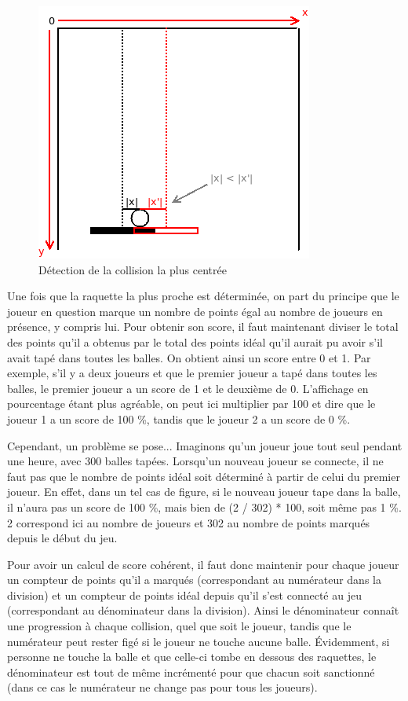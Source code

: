 \documentclass[a4paper,12pt]{article}
\begin{document}
\begin{figure}[h]
 \begin{center}
  \includegraphics[scale=.5]{collision.png}
 \end{center}
 \caption{Détection de la collision la plus centrée}
\end{figure}

Une fois que la raquette la plus proche est déterminée, on part du principe que le joueur en question marque un nombre de points égal au nombre de joueurs en présence, y compris lui. Pour obtenir son score, il faut maintenant diviser le total des points qu'il a obtenus par le total des points idéal qu'il aurait pu avoir s'il avait tapé dans toutes les balles. On obtient ainsi un score entre 0 et 1. Par exemple, s'il y a deux joueurs et que le premier joueur a tapé dans toutes les balles, le premier joueur a un score de 1 et le deuxième de 0. L'affichage en pourcentage étant plus agréable, on peut ici multiplier par 100 et dire que le joueur 1 a un score de 100 \%, tandis que le joueur 2 a un score de 0 \%.

Cependant, un problème se pose... Imaginons qu'un joueur joue tout seul pendant une heure, avec 300 balles tapées. Lorsqu'un nouveau joueur se connecte, il ne faut pas que le nombre de points idéal soit déterminé à partir de celui du premier joueur. En effet, dans un tel cas de figure, si le nouveau joueur tape dans la balle, il n'aura pas un score de 100 \%, mais bien de (2 / 302) * 100, soit même pas 1 \%. 2 correspond ici au nombre de joueurs et 302 au nombre de points marqués depuis le début du jeu.

Pour avoir un calcul de score cohérent, il faut donc maintenir pour chaque joueur un compteur de points qu'il a marqués (correspondant au numérateur dans la division) et un compteur de points idéal depuis qu'il s'est connecté au jeu (correspondant au dénominateur dans la division). Ainsi le dénominateur connaît une progression à chaque collision, quel que soit le joueur, tandis que le numérateur peut rester figé si le joueur ne touche aucune balle. Évidemment, si personne ne touche la balle et que celle-ci tombe en dessous des raquettes, le dénominateur est tout de même incrémenté pour que chacun soit sanctionné (dans ce cas le numérateur ne change pas pour tous les joueurs).
\end{document}
